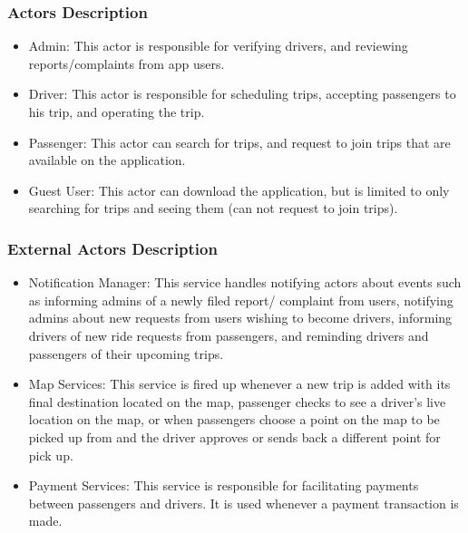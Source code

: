 \documentclass[a4paper, 12pt]{report} %
\begin{document}
        \subsubsection{Actors Description}
            \begin{itemize}
                \item Admin: This actor is responsible for verifying drivers, and reviewing reports/complaints from app users.
                \item Driver: This actor is responsible for scheduling trips, accepting passengers to his trip, and operating the trip.
                \item Passenger: This actor can search for trips, and request to join trips that are available on the application.
                \item Guest User: This actor can download the application, but is limited to only searching for trips and seeing them (can not request to join trips).
            \end{itemize}
        \subsubsection{External Actors Description}
            \begin{itemize}
                \item Notification Manager: This service handles notifying actors about events such as informing admins of a newly filed report/ complaint from users, notifying admins about new requests from users wishing to become drivers, informing drivers of new ride requests from passengers, and reminding drivers and passengers of their upcoming trips.
                \item Map Services: This service is fired up whenever a new trip is added with its final destination located on the map, passenger checks to see a driver’s live location on the map, or when passengers choose a point on the map to be picked up from and the driver approves or sends back a different point for pick up.
                \item Payment Services: This service is responsible for facilitating payments between passengers and drivers. It is used whenever a payment transaction is made.
            \end{itemize}
\end{document}
